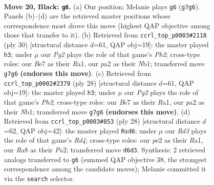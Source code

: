 \documentclass[11pt]{article}
\begin{document}
\begin{figure}[p]
\label{fig:thought-m37}
\end{figure}

\clearpage

\begin{figure}[p]\centering
\begin{subfigure}{0.46\textwidth}\centering
\resizebox{\linewidth}{!}{%
\newchessgame
\chessboard[
  setfen={rnb3k1/1p2bpp1/pn1rp3/7p/8/1P2P1P1/P1pNP1BP/R1B1RK2 b - - 1 20},
  showmover=false,
  pgfstyle=straightmove, color=movearrow, markmove={g7-g6}
]}
\caption{}
\end{subfigure}\hfill
\begin{subfigure}{0.46\textwidth}\centering
\resizebox{\linewidth}{!}{%
\newchessgame
\chessboard[
  setfen={r1b1r1k1/3nbppp/p3p3/1p1n4/8/1N2PB2/PP3PPP/RNBR2K1 w - - 6 16},
  showmover=false,
  pgfstyle=straightmove, color=movearrow, markmove={h2-h3}
]}
\caption{}
\end{subfigure}
\\[4pt]
\begin{subfigure}{0.46\textwidth}\centering
\resizebox{\linewidth}{!}{%
\newchessgame
\chessboard[
  setfen={r1b1r1k1/3nbppp/p3p3/1p1n4/8/1N2PB2/PP3PPP/RNBR2K1 w - - 6 15},
  showmover=false,
  pgfstyle=straightmove, color=movearrow, markmove={h2-h3}
]}
\caption{}
\end{subfigure}\hfill
\begin{subfigure}{0.46\textwidth}\centering
\resizebox{\linewidth}{!}{%
\newchessgame
\chessboard[
  setfen={r1b1r1k1/pp3ppp/2pp1n2/8/3RP3/4BN2/PPP2PPP/R5K1 w - - 1 15},
  showmover=false,
  pgfstyle=straightmove, color=movearrow, markmove={d4-d6}
]}
\caption{}
\end{subfigure}
\caption{\textbf{Move 20, Black: \texttt{g6}.} (a) Our position; Melanie plays \texttt{g6} (\texttt{g7g6}). Panels (b)--(d) are the retrieved master positions whose correspondence most drove this move (highest QAP objective among those that transfer to it). (b) Retrieved from \texttt{ccrl\_top\_p0003\#2118} (ply 30) [structural distance $d$=61, QAP obj=19]: the master played \texttt{h3}; under $\mu$ our \emph{Pg2} plays the role of that game's \emph{Ph2}; cross-type roles: our \emph{B}e7 as their \emph{R}a1, our \emph{p}a2 as their \emph{N}b1; transferred move \texttt{g7g6} \textbf{(endorses this move)}. (c) Retrieved from \texttt{ccrl\_top\_p0002\#2379} (ply 28) [structural distance $d$=61, QAP obj=19]: the master played \texttt{h3}; under $\mu$ our \emph{Pg2} plays the role of that game's \emph{Ph2}; cross-type roles: our \emph{B}e7 as their \emph{R}a1, our \emph{p}a2 as their \emph{N}b1; transferred move \texttt{g7g6} \textbf{(endorses this move)}. (d) Retrieved from \texttt{ccrl\_top\_p0003\#853} (ply 28) [structural distance $d$=62, QAP obj=42]: the master played \texttt{Rxd6}; under $\mu$ our \emph{Rd3} plays the role of that game's \emph{Rd4}; cross-type roles: our \emph{p}e2 as their \emph{R}a1, our \emph{R}a8 as their \emph{P}a2; transferred move \texttt{d6d3}. Synthesis: 2 retrieved analogs transferred to \texttt{g6} (summed QAP objective 38, the strongest correspondence among the candidate moves); Melanie committed it via the \texttt{search} selector.}
\label{fig:thought-m39}
\end{figure}
\end{document}
